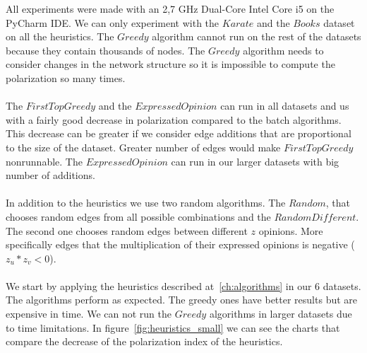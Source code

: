 All experiments were made with an 2,7 GHz Dual-Core Intel Core i5 on the PyCharm IDE. We can only experiment with the $Karate$ and the $Books$ dataset on all the heuristics. The $Greedy$ algorithm cannot run on the rest of the datasets because they contain thousands of nodes. The $Greedy$ algorithm needs to consider changes in the network structure so it is impossible to compute the polarization so many times.
\\
\\ 
The $FirstTopGreedy$ and the $Expressed Opinion$ can run in all datasets and us with a fairly good decrease in polarization compared to the batch algorithms. This decrease can be greater if we consider edge additions that are proportional to the size of the dataset. Greater number of edges would make $FirstTopGreedy$ nonrunnable. The $Expressed Opinion$ can run in our larger datasets with big number of additions.
\\
\\
In addition to the heuristics we use two random algorithms. The $Random$, that chooses random edges from all possible combinations and the $RandomDifferent$. The second one chooses random edges between different $z$ opinions. More specifically edges that the multiplication of their expressed opinions is negative ($z_u*z_v < 0$). 
\\
\\
\noindent We start by applying the heuristics described at~\ref{ch:algorithms} in our 6 datasets. The algorithms perform as expected. The greedy ones have better results but are expensive in time. We can not run the $Greedy$ algorithms in larger datasets due to time limitations. In figure~\ref{fig:heuristics_small} we can see the charts that compare the decrease of the polarization index of the heuristics.
\clearpage

